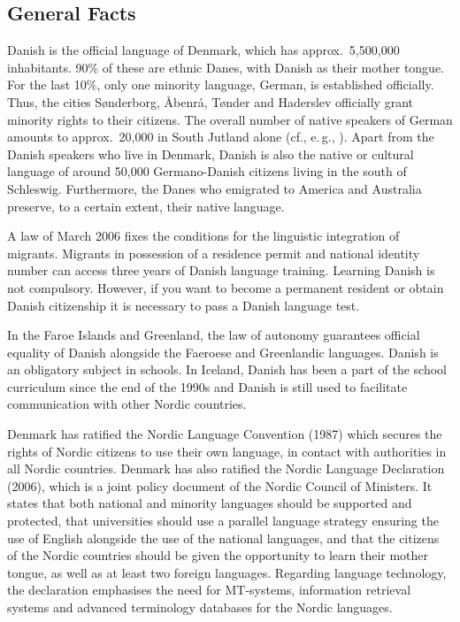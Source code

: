 \begin{multicols}{2}

\subsection{General Facts}


Danish is the official language of Denmark, which has approx.\ 5,500,000 inhabitants. 90\% of these are ethnic Danes, with Danish as their mother tongue. For the last 10\%, only one minority language, German, is established officially. Thus, the cities S\o nderborg, \mbox{\AA benr\aa}, T\o nder and Haderslev officially grant minority rights to their citizens. The overall number of native speakers of German amounts to approx.\ 20,000 in South Jutland alone (cf., e.\,g., \cite{Danmark}).  
Apart from the Danish speakers who live in Denmark, Danish is also the native or cultural language of around 50,000 Germano-Danish citizens living in the south of Schleswig. Furthermore, the Danes who emigrated to America and Australia preserve, to a certain extent, their native language.

A law of March 2006 fixes the conditions for the linguistic integration of migrants. Migrants in possession of a residence permit and national identity number can access three years of Danish language training. Learning Danish is not compulsory. However, if you want to become a permanent resident or obtain Danish citizenship it is necessary to pass a Danish language test.

In the Faroe Islands and Greenland, the law of autonomy guarantees official equality of Danish alongside the Faeroese and Greenlandic languages. Danish is an obligatory subject in schools. In Iceland, Danish has been a part of the school curriculum since the end of the 1990s and Danish is still used to facilitate communication with other Nordic countries. 

Denmark has ratified the Nordic Language Convention (1987) which secures the rights of Nordic citizens to use their own language, in contact with authorities in all Nordic countries.  Denmark has also ratified the Nordic Language Declaration (2006), which is a joint policy document of the Nordic Council of Ministers. It states that both national and minority languages should be supported and protected, that universities should use a parallel language strategy ensuring the use of English alongside the use of the national languages, and that the citizens of the Nordic countries should be given the opportunity to learn their mother tongue, as well as at least two foreign languages.  Regarding language technology, the declaration emphasises the need for MT-systems, information retrieval systems and advanced terminology databases for the Nordic languages.


\end{multicols}

